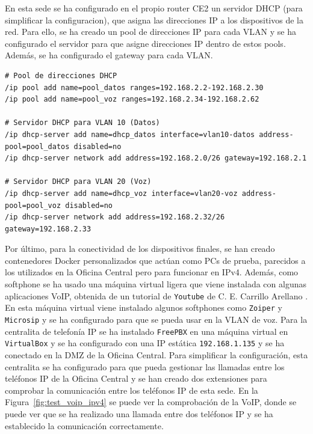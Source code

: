 En esta sede se ha configurado en el propio router CE2 un servidor DHCP (para simplificar la configuracion), que asigna las direcciones IP a los dispositivos de la red. Para ello, se ha creado un pool de direcciones IP para cada VLAN y se ha configurado el servidor para que asigne direcciones IP dentro de estos pools. Además, se ha configurado el gateway para cada VLAN.
\begin{lstlisting}[language=RouterOS]
# Pool de direcciones DHCP
/ip pool add name=pool_datos ranges=192.168.2.2-192.168.2.30
/ip pool add name=pool_voz ranges=192.168.2.34-192.168.2.62

# Servidor DHCP para VLAN 10 (Datos)
/ip dhcp-server add name=dhcp_datos interface=vlan10-datos address-pool=pool_datos disabled=no
/ip dhcp-server network add address=192.168.2.0/26 gateway=192.168.2.1

# Servidor DHCP para VLAN 20 (Voz)
/ip dhcp-server add name=dhcp_voz interface=vlan20-voz address-pool=pool_voz disabled=no
/ip dhcp-server network add address=192.168.2.32/26 gateway=192.168.2.33
\end{lstlisting}

Por último, para la conectividad de los dispositivos finales, se han creado contenedores Docker personalizados que actúan como PCs de prueba, parecidos a los utilizados en la Oficina Central pero para funcionar en IPv4. Además, como softphone se ha usado una máquina virtual ligera que viene instalada con algunas aplicaciones VoIP, obtenida de un tutorial de \texttt{Youtube} de C. E. Carrillo Arellano \cite{youtube_carlos_carrillo}. En esta máquina virtual viene instalado algunos softphones como \texttt{Zoiper} y \texttt{Microsip} y se ha configurado para que se pueda usar en la VLAN de voz. Para la centralita de telefonía IP se ha instalado \texttt{FreePBX} en una máquina virtual en \texttt{VirtualBox} y se ha configurado con una IP estática \texttt{192.168.1.135} y se ha conectado en la DMZ de la Oficina Central. Para simplificar la configuración, esta centralita se ha configurado para que pueda gestionar las llamadas entre los teléfonos IP de la Oficina Central y se han creado dos extensiones para comprobar la comunicación entre
los teléfonos IP de esta sede. En la Figura~\ref{fig:test_voip_ipv4} se puede ver la comprobación de la VoIP, donde se puede ver que se ha realizado una llamada entre dos teléfonos IP y se ha establecido la comunicación correctamente.

